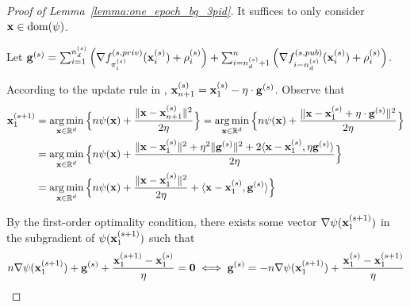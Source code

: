 \begin{proof}[Proof of Lemma~\ref{lemma:one_epoch_bg_3pid}]
    It suffices to only consider ${\mathbf{x}} \in \text{dom}(\psi)$. 

    Let ${\mathbf{g}}^{(s)} = \sum_{i=1}^{n_d^{(s)}}\Big( \nabla f_{\pi_i^{(s)}}^{(s, priv)} ({\mathbf{x}}_i^{(s)}) + \rho_i^{(s)}\Big)
    + \sum_{i=n_d^{(s)}+1}^{n} \Big( \nabla f_{i-n_d^{(s)}}^{(s, pub)}({\mathbf{x}}_{i}^{(s)}) + \rho_i^{(s)}\Big)$.

    According to the update rule in , ${\mathbf{x}}_{n+1}^{(s)} = {\mathbf{x}}_1^{(s)} - \eta \cdot {\mathbf{g}}^{(s)}$. Observe that
    \begin{align*}
        {\mathbf{x}}_1^{(s+1)} 
        &= \operatorname*{arg\,min}_{{\mathbf{x}} \in \mathbb{R}^d} \Big\{ n \psi({\mathbf{x}}) + \frac{\| {\mathbf{x}} - {\mathbf{x}}_{n+1}^{(s)}\|^2}{2\eta} \Big\}
        = \operatorname*{arg\,min}_{{\mathbf{x}} \in \mathbb{R}^d} \Big\{ n\psi({\mathbf{x}}) + \frac{\| {\mathbf{x}} - {\mathbf{x}}_1^{(s)} + \eta \cdot {\mathbf{g}}^{(s)}\|^2}{2 \eta} \Big\}\\
        &= \operatorname*{arg\,min}_{{\mathbf{x}}\in\mathbb{R}^d}\Big\{ n \psi({\mathbf{x}}) + \frac{\|{\mathbf{x}} - {\mathbf{x}}_1^{(s)}\|^2 + \eta^2 \|{\mathbf{g}}^{(s)}\|^2 + 2 \langle {\mathbf{x}} - {\mathbf{x}}_1^{(s)}, \eta {\mathbf{g}}^{(s)} \rangle}{2 \eta}
        \Big\}\\
        &= \operatorname*{arg\,min}_{{\mathbf{x}} \in \mathbb{R}^d}\Big\{ n \psi({\mathbf{x}}) + \frac{\|{\mathbf{x}} - {\mathbf{x}}_1^{(s)}\|^2}{2\eta} + \langle {\mathbf{x}} - {\mathbf{x}}_1^{(s)}, {\mathbf{g}}^{(s)}\rangle
        \Big\}
    \end{align*}

    By the first-order optimality condition, there exists some vector $\nabla \psi({\mathbf{x}}_1^{(s+1)})$ 
    in the subgradient of $\psi({\mathbf{x}}_1^{(s+1)})$ such that
    \begin{align*}
        n \nabla \psi ({\mathbf{x}}_1^{(s+1)}) + {\mathbf{g}}^{(s)} + \frac{{\mathbf{x}}_1^{(s+1)} - {\mathbf{x}}_1^{(s)}}{\eta} = \mathbf{0}
        \iff {\mathbf{g}}^{(s)} = -n \nabla \psi({\mathbf{x}}_1^{(s+1)}) + \frac{{\mathbf{x}}_1^{(s)} - {\mathbf{x}}_1^{(s+1)}}{\eta}
    \end{align*}


\end{proof}
